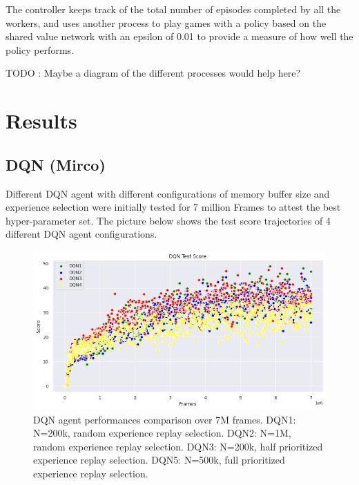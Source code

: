 \documentclass{article}
\begin{document}
The controller keeps track of the total number of episodes completed by all the workers, and uses another process to play games with a policy based on the shared value network with an epsilon of 0.01 to provide a measure of how well the policy performs.

TODO : Maybe a diagram of the different processes would help here?


\section{Results}


\subsection{DQN (Mirco)}

Different DQN agent with different configurations of memory buffer size and experience selection were initially tested for 7 million Frames to attest the best hyper-parameter set. The picture below shows the test score trajectories of 4 different DQN agent configurations. 
\begin{figure}[H]
\centering
\includegraphics[scale=0.5]{DQNAgentComparison.PNG}
\caption[width=0.7\textwidth]{DQN agent performances comparison over 7M frames. DQN1: N=200k, random experience replay selection. DQN2: N=1M, random experience replay selection. DQN3: N=200k, half prioritized experience replay selection. DQN5: N=500k, full prioritized experience replay selection.}
\label{fig:DQNAgentComparison}
\end{figure}
\end{document}
